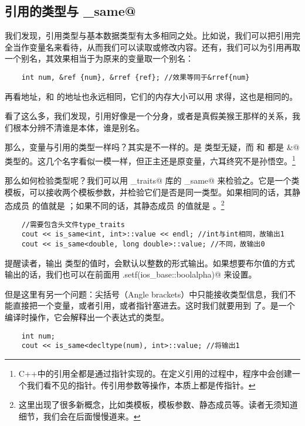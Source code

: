 \subsection*{引用的类型与 \lstinline@is_same@}
我们发现，引用类型与基本数据类型有太多相同之处。比如说，我们可以把引用完全当作变量名来看待，从而我们可以读取或修改内容。还有，我们可以为引用再取一个别名，其效果相当于为原来的变量取一个别名：
\begin{lstlisting}
    int num, &ref {num}, &rref {ref}; //效果等同于&rref{num}
\end{lstlisting}
再看地址，\lstinline@num@ 和 \lstinline@ref@ 的地址也永远相同，它们的内存大小可以用 \lstinline@sizeof@ 求得，这也是相同的。\par
看了这么多，我们发现，引用好像是一个分身，或者是真假美猴王那样的关系，我们根本分辨不清谁是本体，谁是别名。\par
那么，变量与引用的类型一样吗？其实是不一样的。\lstinline@num@ 是 \lstinline@int@ 类型无疑，而 \lstinline@ref@ 和 \lstinline@rref@ 都是 \lstinline@int&@ 类型的。这几个名字看似一模一样，但正主还是原变量，六耳终究不是孙悟空。\footnote{C++中的引用全都是通过指针实现的。在定义引用的过程中，程序中会创建一个我们看不见的指针。传引用参数等操作，本质上都是传指针。}\par
那么如何检验类型呢？我们可以用 \lstinline@type_traits@ 库的 \lstinline@is_same@ 来检验之。它是一个类模板，可以接收两个模板参数，并检验它们是否是同一类型。如果相同的话，其静态成员 \lstinline@value@ 的值就是 \lstinline@true@；如果不同的话，其静态成员 \lstinline@value@ 的值就是 \lstinline@false@。\footnote{这里出现了很多新概念，比如类模板，模板参数、静态成员等。读者无须知道细节，我们会在后面慢慢道来。}
\begin{lstlisting}
    //需要包含头文件type_traits
    cout << is_same<int, int>::value << endl; //int与int相同，故输出1
    cout << is_same<double, long double>::value; //不同，故输出0
\end{lstlisting}
提醒读者，\lstinline@cout@ 输出 \lstinline@bool@ 类型的值时，会默认以整数的形式输出。如果想要布尔值的方式输出的话，我们也可以在前面用 \lstinline@cout.setf(ios_base::boolalpha)@ 来设置。\par
但是这里有另一个问题：尖括号（Angle brackets）中只能接收类型信息，我们不能直接把一个变量，或者引用，或者指针塞进去。这时我们就要用到 \lstinline@decltype@ 了。\lstinline@decltype@ 是一个编译时操作，它会解释出一个表达式的类型。
\begin{lstlisting}
    int num;
    cout << is_same<decltype(num), int>::value; //将输出1
\end{lstlisting}
